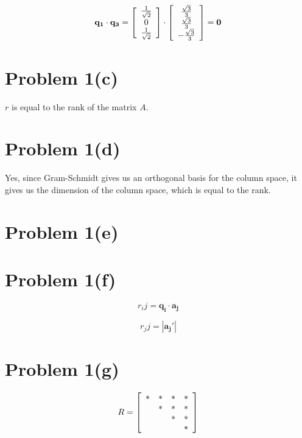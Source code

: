 \documentclass{article}
\begin{document}
$$
\mathbf{q_1} \cdot \mathbf{q_3} = 
\left[ \begin{array} {*{3}c} 
    \frac{1}{\sqrt{2}} \\
    0 \\
    \frac{1}{\sqrt{2}} \\
\end{array}\right] 
\cdot 
\left[ \begin{array} {*{3}c} 
    \frac{\sqrt{3}}{3} \\
    \frac{\sqrt{3}}{3} \\
    - \frac{\sqrt{3}}{3} \\
\end{array}\right]
= \mathbf{0}
$$

\section*{Problem 1(c)}

$r$ is equal to the rank of the matrix $A$.

\section*{Problem 1(d)}

Yes, since Gram-Schmidt gives us an orthogonal basis for the column space, it gives us the dimension of the column space, which is equal to the rank.

\section*{Problem 1(e)}

\section*{Problem 1(f)}


$$ r_ij = \mathbf{q_i} \cdot \mathbf{a_j} $$

$$ r_jj = |\mathbf{a_j'}|$$

\section*{Problem 1(g)}

\[
R = \left[\begin{array}{*{4}c}
 \ast & \ast  & \ast & \ast\\
 & \ast & \ast & \ast\\
 &  & \ast &\ast \\
 &  &  & \ast
\end{array}\right]
\]
\end{document}
